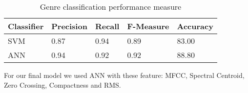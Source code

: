 \begin{table}[h!]
        \caption{Genre classification performance measure}
        \begin{center}
                \begin{tabular}{|l|l|l|l|l|}
                        \hline

                        Classifier
                        &
                        Precision 
                        &
                        Recall 
                        &
                        F-Measure
                        &
                        Accuracy
                        \\\hline

                        SVM
                        &
                        0.87
                        &
                        0.94
                        &
                        0.89
                        &
                        83.00
                        \\\hline


                        ANN
                        &
                        0.94
                        &
                        0.92
                        &
                        0.92
                        &
                        88.80
                        \\\hline
                \end{tabular}
        \end{center}
\end{table}

For our final model we used ANN with these feature: MFCC, Spectral Centroid, Zero Crossing, Compactness and RMS.

